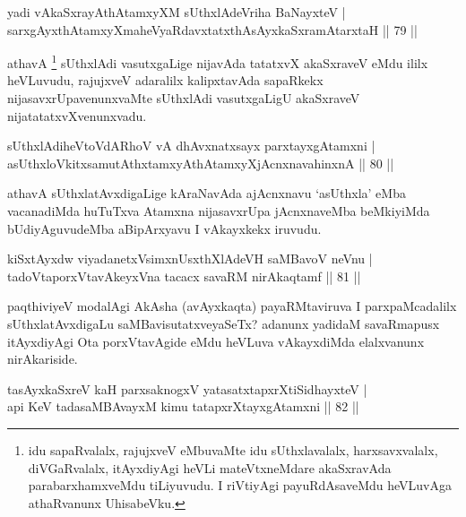 \begin{shl}
yadi vA\s kaSxrayAthAtamxyXM sUthxlAdeVriha BaNayxteV |\\
sarxgAyxthAtamxyXmaheVyaRdavxtatxthA\s sAyxkaSxramAtarxtaH \hfill || 79 ||
\end{shl}

\begin{artha}
athavA \footnote[2]{idu sapaRvalalx, rajujxveV eMbuvaMte idu sUthxlavalalx, harxsavxvalalx, diVGaRvalalx, itAyxdiyAgi heVLi mateVtxneMdare akaSxravAda parabarxhamxveMdu tiLiyuvudu. I riVtiyAgi payuRdAsaveMdu heVLuvAga athaRvanunx UhisabeVku.} sUthxlAdi vasutxgaLige nijavAda tatatxvX akaSxraveV eMdu ililx heVLuvudu, rajujxveV adaralilx kalipxtavAda sapaRkekx nijasavxrUpavenunxvaMte sUthxlAdi vasutxgaLigU akaSxraveV nijatatatxvXvenunxvadu.
\end{artha}

\begin{shl}
sUthxlAdiheVtoVdARhoV vA dhAvxnatxsayx parxtayxgAtamxni |\\
asUthxloVkitxsamutAthxtamxyAthAtamxyXjAcnxnavahinxnA \hfill || 80 ||
\end{shl}

\begin{artha}
athavA sUthxlatAvxdigaLige kAraNavAda ajAcnxnavu `asUthxla' eMba vacanadiMda huTuTxva Atamxna nijasavxrUpa jAcnxnaveMba beMkiyiMda bUdiyAguvudeMba aBipArxyavu I vAkayxkekx iruvudu.
\end{artha}


\begin{shl}
kiSxtAyxdw viyadanetxV\s simxnUsxthXlAdeVH saMBavoV neVnu |\\
tadoVtaporxVtavAkeyxVna tacacx savaRM nirAkaqtamf \hfill || 81 ||
\end{shl}

\begin{artha}%
paqthiviyeV modalAgi AkAsha (avAyxkaqta) payaRMtaviruva I parxpaMcadalilx sUthxlatAvxdigaLu saMBavisutatxveyaSeTx? adanunx yadidaM savaRmapusx itAyxdiyAgi Ota porxVtavAgide eMdu heVLuva vAkayxdiMda elalxvanunx nirAkariside.
\end{artha}


\begin{shl}
tasAyxkaSxreV kaH parxsaknogxV yatasatxtapxrXtiSidhayxteV |\\
api KeV tadasaMBAvayxM kimu tatapxrXtayxgAtamxni \hfill || 82 ||
\end{shl}

